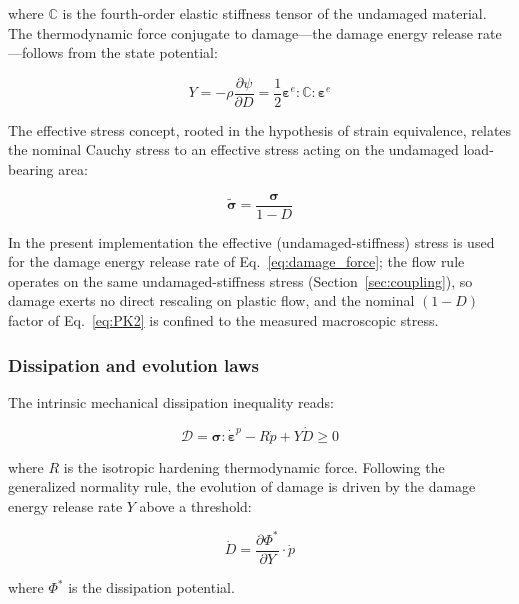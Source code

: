 \documentclass[twocolumn]{sagej}
\begin{document}
where $\mathbb{C}$ is the fourth-order elastic stiffness tensor of the undamaged material. The thermodynamic force conjugate to damage---the damage energy release rate---follows from the state potential:

\begin{equation}
Y = -\rho\frac{\partial\psi}{\partial D} = \frac{1}{2}\boldsymbol{\varepsilon}^e : \mathbb{C} : \boldsymbol{\varepsilon}^e
\label{eq:damage_force}
\end{equation}

The effective stress concept, rooted in the hypothesis of strain equivalence, relates the nominal Cauchy stress to an effective stress acting on the undamaged load-bearing area:

\begin{equation}
\tilde{\boldsymbol{\sigma}} = \frac{\boldsymbol{\sigma}}{1-D}
\label{eq:effective_stress}
\end{equation}

In the present implementation the effective (undamaged-stiffness) stress is used for the damage energy release rate of Eq.~\eqref{eq:damage_force}; the flow rule operates on the same undamaged-stiffness stress (Section~\ref{sec:coupling}), so damage exerts no direct rescaling on plastic flow, and the nominal $(1-D)$ factor of Eq.~\eqref{eq:PK2} is confined to the measured macroscopic stress.

\subsubsection{Dissipation and evolution laws}

The intrinsic mechanical dissipation inequality reads:

\begin{equation}
\mathcal{D} = \boldsymbol{\sigma} : \dot{\boldsymbol{\varepsilon}}^p - R\dot{p} + Y\dot{D} \ge 0
\label{eq:dissipation}
\end{equation}

where $R$ is the isotropic hardening thermodynamic force. Following the generalized normality rule, the evolution of damage is driven by the damage energy release rate $Y$ above a threshold:

\begin{equation}
\dot{D} = \frac{\partial \Phi^*}{\partial Y} \cdot \dot{p}
\label{eq:damage_evolution_general}
\end{equation}

where $\Phi^*$ is the dissipation potential.
\end{document}
